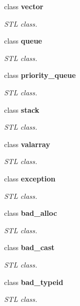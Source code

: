 \begin{DoxyCompactItemize}
class {\bfseries vector}
\begin{DoxyCompactList}\small\item\em STL class. \item\end{DoxyCompactList}\item 
class {\bfseries queue}
\begin{DoxyCompactList}\small\item\em STL class. \item\end{DoxyCompactList}\item 
class {\bfseries priority\_\-queue}
\begin{DoxyCompactList}\small\item\em STL class. \item\end{DoxyCompactList}\item 
class {\bfseries stack}
\begin{DoxyCompactList}\small\item\em STL class. \item\end{DoxyCompactList}\item 
class {\bfseries valarray}
\begin{DoxyCompactList}\small\item\em STL class. \item\end{DoxyCompactList}\item 
class {\bfseries exception}
\begin{DoxyCompactList}\small\item\em STL class. \item\end{DoxyCompactList}\item 
class {\bfseries bad\_\-alloc}
\begin{DoxyCompactList}\small\item\em STL class. \item\end{DoxyCompactList}\item 
class {\bfseries bad\_\-cast}
\begin{DoxyCompactList}\small\item\em STL class. \item\end{DoxyCompactList}\item 
class {\bfseries bad\_\-typeid}
\begin{DoxyCompactList}\small\item\em STL class. \item\end{DoxyCompactList}\item 

\end{DoxyCompactItemize}

